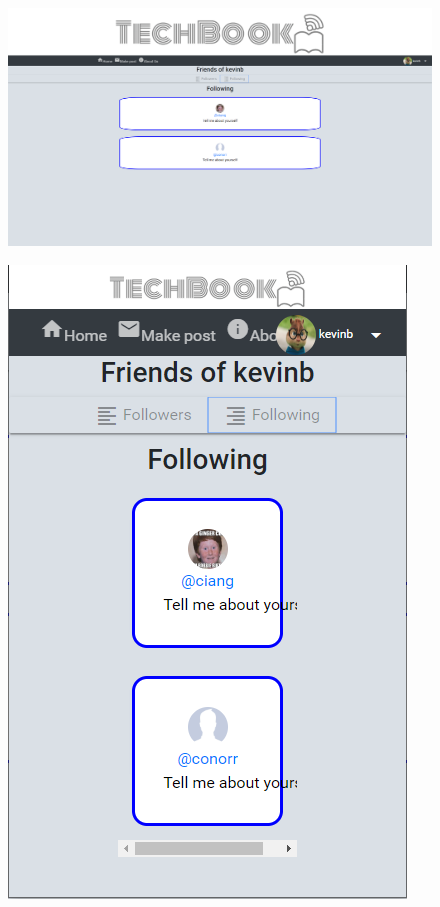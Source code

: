 \begin{figure}[H]
\centering
\begin{minipage}{.75\textwidth}
  \centering
  \includegraphics[width=.9\linewidth]{img/ui/followPC.PNG}
  \label{fig:followPC}
\end{minipage}%
\begin{minipage}{.25\textwidth}
  \centering
  \includegraphics[width=.9\linewidth]{img/ui/followMOBILE.PNG}
  \label{fig:followMOBILE}
\end{minipage}
\end{figure}

